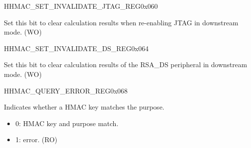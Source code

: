 \begin{register}{H}{HMAC\_SET\_INVALIDATE\_JTAG\_REG}{0x{}060}\label{regdesc:HMACSETINVALIDATEJTAGREG}
%
%
\regnewline%
\begin{regdesc}\begin{reglist}
\label{fielddesc:HMACSETINVALIDATEJTAG}\item [HMAC\_SET\_INVALIDATE\_JTAG] Set this bit to clear calculation results when re-enabling JTAG in downstream mode. (WO)
\end{reglist}\end{regdesc}
\end{register}


\begin{register}{H}{HMAC\_SET\_INVALIDATE\_DS\_REG}{0x{}064}\label{regdesc:HMACSETINVALIDATEDSREG}
%
%
\regnewline%
\begin{regdesc}\begin{reglist}
\label{fielddesc:HMACSETINVALIDATEDS}\item [HMAC\_SET\_INVALIDATE\_DS] Set this bit to clear calculation results of the RSA\_DS peripheral in downstream mode. (WO)
\end{reglist}\end{regdesc}
\end{register}


\begin{register}{H}{HMAC\_QUERY\_ERROR\_REG}{0x{}068}\label{regdesc:HMACQUERYERRORREG}
%
%
\regnewline%
\begin{regdesc}\begin{reglist}
\label{fielddesc:HMACQUREYCHECK}\item [HMAC\_QUREY\_CHECK] Indicates whether a HMAC key matches the purpose.
\begin{itemize}
    \item 0: HMAC key and purpose match.
    \item 1: error. (RO)
\end{itemize}
\end{reglist}\end{regdesc}
\end{register}


